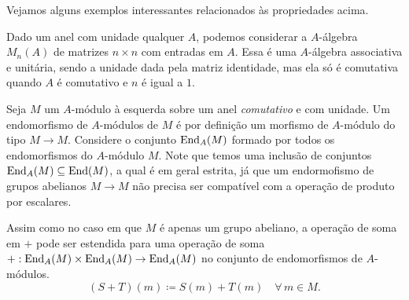 Vejamos alguns exemplos interessantes relacionados às propriedades acima.

\begin{exem}\label{exem:algebra_matrizes}
  Dado um anel com unidade qualquer $A$, podemos considerar a $A$-álgebra $M_n(A)$ de matrizes $n \times n$ com entradas em $A$.
  Essa é uma $A$-álgebra associativa e unitária, sendo a unidade dada pela matriz identidade, mas ela só é comutativa quando $A$ é comutativo e $n$ é igual a $1$.
\end{exem}

\begin{exem}
  Seja $M$ um $A$-módulo à esquerda sobre um anel \emph{comutativo} e com unidade.
  Um endomorfismo de $A$-módulos de $M$ é por definição um morfismo de $A$-módulo do tipo $M \to M$.
  Considere o conjunto $\mathrm{End}_A(M)$ formado por todos os endomorfismos do $A$-módulo $M$.
  Note que temos uma inclusão de conjuntos $\mathrm{End}_{A}(M) \subseteq \mathrm{End}(M)$, a qual é em geral estrita, já que um endormofismo de grupos abelianos $M \to M$ não precisa ser compatível com a operação de produto por escalares.

  Assim como no caso em que $M$ é apenas um grupo abeliano, a operação de soma em $+$ pode ser estendida para uma operação de soma $+: \mathrm{End}_A(M) \times \mathrm{End}_A(M) \to \mathrm{End}_A(M)$ no conjunto de endomorfismos de $A$-módulos.
  \begin{displaymath}
    (S+T)(m) \coloneqq S(m) + T(m) \quad \forall\, m \in M.
  \end{displaymath}


\end{exem}
